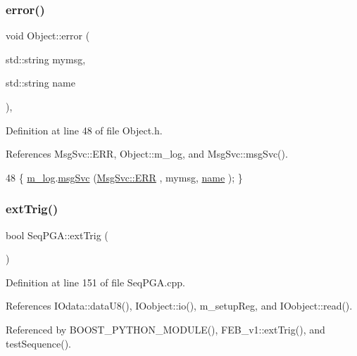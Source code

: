 \subsubsection{\texorpdfstring{error()}{error()}\hspace{0.1cm}{\footnotesize\ttfamily [2/2]}}
{\footnotesize\ttfamily void Object\+::error (\begin{DoxyParamCaption}\item[{std\+::string}]{mymsg,  }\item[{std\+::string}]{name }\end{DoxyParamCaption})\hspace{0.3cm}{\ttfamily [inline]}, {\ttfamily [inherited]}}



Definition at line 48 of file Object.\+h.



References Msg\+Svc\+::\+E\+RR, Object\+::m\+\_\+log, and Msg\+Svc\+::msg\+Svc().


\begin{DoxyCode}
48 \{ \hyperlink{classObject_a0d269813dd7ac1f24bc143031e2963f2}{m\_log}.\hyperlink{classMsgSvc_ad25f18047920cc59a314e5098259711c}{msgSvc} (\hyperlink{classMsgSvc_ae671eb7301996cd049d2da8a65925926a35a9d7166e9896af4ec8fb33bf5f1772}{MsgSvc::ERR}     , mymsg, \hyperlink{classObject_a300f4c05dd468c7bb8b3c968868443c1}{name} ); \}
\end{DoxyCode}
\mbox{\label{classSeqPGA_ae2e0917c379649d106539cc3b8b9ca3c}} 
\subsubsection{\texorpdfstring{ext\+Trig()}{extTrig()}}
{\footnotesize\ttfamily bool Seq\+P\+G\+A\+::ext\+Trig (\begin{DoxyParamCaption}{ }\end{DoxyParamCaption})}



Definition at line 151 of file Seq\+P\+G\+A.\+cpp.



References I\+Odata\+::data\+U8(), I\+Oobject\+::io(), m\+\_\+setup\+Reg, and I\+Oobject\+::read().



Referenced by B\+O\+O\+S\+T\+\_\+\+P\+Y\+T\+H\+O\+N\+\_\+\+M\+O\+D\+U\+L\+E(), F\+E\+B\+\_\+v1\+::ext\+Trig(), and test\+Sequence().


